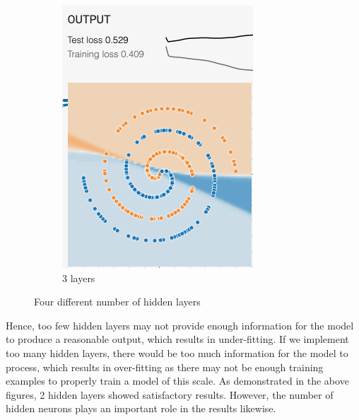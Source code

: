 \documentclass[12pt,a4paper]{article}
\begin{document}
\begin{enumerate}
\begin{figure}[H]
\begin{subfigure}[H]{0.2\textwidth}
				\includegraphics[width=\textwidth]{Figures/hidden/3}
				\caption{3 layers}
			\end{subfigure}
		\vspace{-0.1cm}
			\caption{Four different number of hidden layers}
		\end{figure}
		\vspace{-0.5cm}
		\noindent Hence, too few hidden layers may not provide enough information for the model to produce a reasonable output, which results in under-fitting. If we implement too many hidden layers, there would be too much information for the model to process, which results in over-fitting as there may not be enough training examples to properly train a model of this scale. As demonstrated in the above figures, 2 hidden layers showed satisfactory results. However, the number of hidden neurons plays an important role in the results likewise.
		

\end{enumerate}
\end{document}
